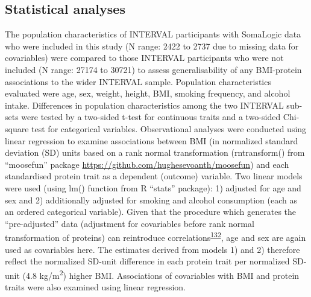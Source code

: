 \documentclass[11pt,twoside]{bristolthesis}
\begin{document}
\hypertarget{statistical-analyses}{%
\subsection{Statistical analyses}\label{statistical-analyses}}

The population characteristics of INTERVAL participants with SomaLogic data who were included in this study (N range: 2422 to 2737 due to missing data for covariables) were compared to those INTERVAL participants who were not included (N range: 27174 to 30721) to assess generalisability of any BMI-protein associations to the wider INTERVAL sample. Population characteristics evaluated were age, sex, weight, height, BMI, smoking frequency, and alcohol intake. Differences in population characteristics among the two INTERVAL sub-sets were tested by a two-sided t-test for continuous traits and a two-sided Chi-square test for categorical variables. Observational analyses were conducted using linear regression to examine associations between BMI (in normalized standard deviation (SD) units based on a rank normal transformation (rntransform() from ``moosefun'' package \url{https://github.com/hughesevoanth/moosefun}) and each standardised protein trait as a dependent (outcome) variable. Two linear models were used (using lm() function from R ``stats'' package): 1) adjusted for age and sex and 2) additionally adjusted for smoking and alcohol consumption (each as an ordered categorical variable). Given that the procedure which generates the ``pre-adjusted'' data (adjustment for covariables before rank normal transformation of proteins) can reintroduce correlations\textsuperscript{\protect\hyperlink{ref-Pain2018}{132}}, age and sex are again used as covariables here. The estimates derived from models 1) and 2) therefore reflect the normalized SD-unit difference in each protein trait per normalized SD-unit (4.8 kg/m\textsuperscript{2}) higher BMI. Associations of covariables with BMI and protein traits were also examined using linear regression.
\end{document}

